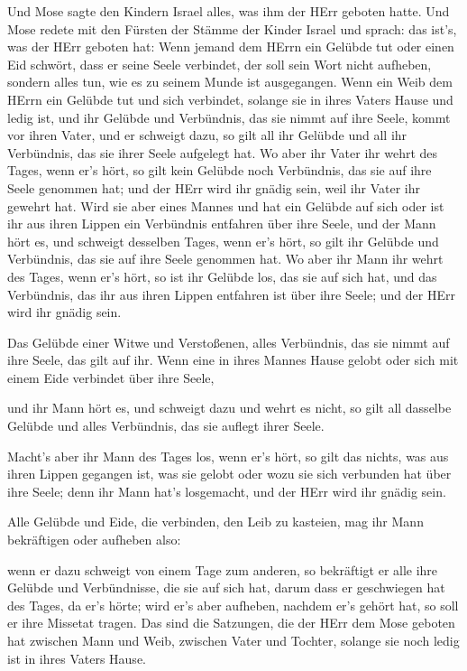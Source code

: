  Und Mose sagte den Kindern Israel alles, was ihm der HErr
geboten hatte.  Und Mose redete mit den Fürsten der Stämme
der Kinder Israel und sprach: das ist's, was der HErr geboten hat:
 Wenn jemand dem HErrn ein Gelübde tut oder einen Eid
schwört, dass er seine Seele verbindet, der soll sein Wort nicht
aufheben, sondern alles tun, wie es zu seinem Munde ist ausgegangen.
 Wenn ein Weib dem HErrn ein Gelübde tut und sich
verbindet, solange sie in ihres Vaters Hause und ledig ist,
 und ihr Gelübde und Verbündnis, das sie nimmt auf ihre
Seele, kommt vor ihren Vater, und er schweigt dazu, so gilt all ihr
Gelübde und all ihr Verbündnis, das sie ihrer Seele aufgelegt hat.
 Wo aber ihr Vater ihr wehrt des Tages, wenn er's hört, so
gilt kein Gelübde noch Verbündnis, das sie auf ihre Seele genommen hat;
und der HErr wird ihr gnädig sein, weil ihr Vater ihr gewehrt hat.
 Wird sie aber eines Mannes und hat ein Gelübde auf sich
oder ist ihr aus ihren Lippen ein Verbündnis entfahren über ihre Seele,
 und der Mann hört es, und schweigt desselben Tages, wenn
er's hört, so gilt ihr Gelübde und Verbündnis, das sie auf ihre Seele
genommen hat.  Wo aber ihr Mann ihr wehrt des Tages, wenn
er's hört, so ist ihr Gelübde los, das sie auf sich hat, und das
Verbündnis, das ihr aus ihren Lippen entfahren ist über ihre Seele; und
der HErr wird ihr gnädig sein.

 Das Gelübde einer Witwe und Verstoßenen, alles
Verbündnis, das sie nimmt auf ihre Seele, das gilt auf ihr.
 Wenn eine in ihres Mannes Hause gelobt oder sich mit
einem Eide verbindet über ihre Seele,

 und ihr Mann hört es, und schweigt dazu und wehrt es
nicht, so gilt all dasselbe Gelübde und alles Verbündnis, das sie
auflegt ihrer Seele.

 Macht's aber ihr Mann des Tages los, wenn er's hört, so
gilt das nichts, was aus ihren Lippen gegangen ist, was sie gelobt oder
wozu sie sich verbunden hat über ihre Seele; denn ihr Mann hat's
losgemacht, und der HErr wird ihr gnädig sein.

 Alle Gelübde und Eide, die verbinden, den Leib zu
kasteien, mag ihr Mann bekräftigen oder aufheben also:

 wenn er dazu schweigt von einem Tage zum anderen, so
bekräftigt er alle ihre Gelübde und Verbündnisse, die sie auf sich hat,
darum dass er geschwiegen hat des Tages, da er's hörte; 
wird er's aber aufheben, nachdem er's gehört hat, so soll er ihre
Missetat tragen.  Das sind die Satzungen, die der HErr
dem Mose geboten hat zwischen Mann und Weib, zwischen Vater und Tochter,
solange sie noch ledig ist in ihres Vaters Hause.

